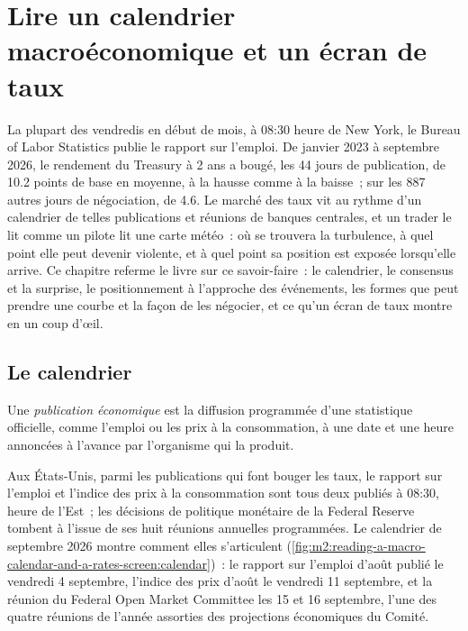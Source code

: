 \chapter{Lire un calendrier macroéconomique et un écran de taux}\label{ch:m2:reading-a-macro-calendar-and-a-rates-screen}

La plupart des vendredis en début de mois, à 08:30 heure de New York, le Bureau of Labor
Statistics publie le rapport sur l'emploi. De janvier 2023 à septembre 2026, le
rendement du Treasury à 2 ans a bougé, les 44 jours de publication, de 10.2 points de base en moyenne,
à la hausse comme à la baisse~; sur les 887 autres jours de négociation, de 4.6. Le marché des taux vit au rythme d'un calendrier de
telles publications et réunions de banques centrales, et un trader le lit comme un pilote lit une
carte météo~: où se trouvera la turbulence, à quel point elle peut devenir violente, et
à quel point sa position est exposée lorsqu'elle arrive. Ce chapitre referme le livre sur ce savoir-faire~: le calendrier,
le consensus et la surprise, le positionnement à l'approche des événements, les formes que peut prendre une courbe et
la façon de les négocier, et ce qu'un écran de taux montre en un coup d'œil.

\section{Le calendrier}

\begin{definition}\label{def:m2:reading-a-macro-calendar-and-a-rates-screen:release}
Une \emph{publication économique} est la diffusion programmée d'une
statistique officielle, comme l'emploi ou les prix à la consommation, à une date et une heure annoncées
à l'avance par l'organisme qui la produit.
\end{definition}

Aux États-Unis, parmi les publications qui font bouger les taux, le rapport sur l'emploi et
l'indice des prix à la consommation sont tous deux publiés à 08:30, heure de l'Est~; les décisions
de politique monétaire de la Federal Reserve tombent à l'issue de ses huit réunions annuelles programmées. Le calendrier de
septembre 2026 montre comment elles s'articulent
(\cref{fig:m2:reading-a-macro-calendar-and-a-rates-screen:calendar})~: le rapport sur l'emploi d'août
publié le vendredi 4 septembre, l'indice des prix d'août le vendredi 11 septembre, et la
réunion du Federal Open Market Committee les 15 et 16 septembre, l'une des quatre réunions de l'année
assorties des projections économiques du Comité.

